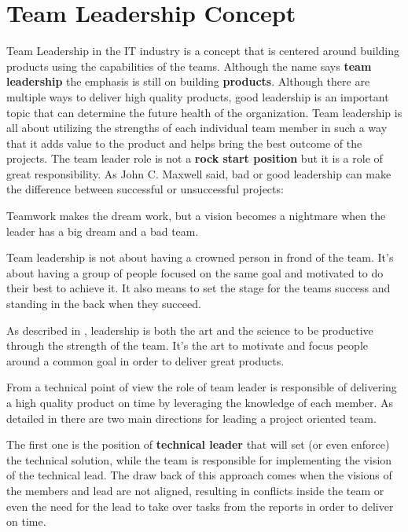 \section{Team Leadership Concept}
\label{sec:tl}
Team Leadership in the IT industry is a concept that is centered around building products using the capabilities of the teams. Although the name says \textbf{team leadership} the emphasis is still on building \textbf{products}. Although there are multiple ways to deliver high quality products, good leadership is an important topic that can determine the future health of the organization. Team leadership is all about utilizing the strengths of each individual team member in such a way that it adds value to the product and helps bring the best outcome of the projects. The team leader role is not a \textbf{rock start position} but it is a role of great responsibility. As John C. Maxwell said, bad or good leadership can make the difference between successful or unsuccessful projects:
\begin{displayquote}
Teamwork makes the dream work, but a vision becomes a nightmare when the leader has a big dream and a bad team.
\end{displayquote}
Team leadership is not about having a crowned person in frond of the team. It's about having a group of people focused on the same goal and motivated to do their best to achieve it. It also means to set the stage for the teams success and standing in the back when they succeed. 

As described in \cite{abur-tl}, leadership is both the art and the science to be productive through the strength of the team. It's the art to motivate and focus people around a common goal in order to deliver great products.

From a technical point of view the role of team leader is responsible of delivering a high quality product on time by leveraging the knowledge of each member. As detailed in  there are two main directions for leading a project oriented team.

The first one is the position of \textbf{technical leader} that will set (or even enforce) the technical solution, while the team is responsible for implementing the vision of the technical lead. The draw back of this approach comes when the visions of the members and lead are not aligned, resulting in conflicts inside the team or even the need for the lead to take over tasks from the reports in order to deliver on time.

